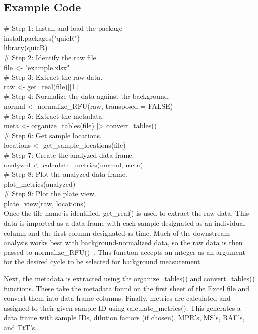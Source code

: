\documentclass[preprint,12pt,a4paper]{elsarticle}
\begin{document}
        \subsection{Example Code}
            \# Step 1: Install and load the package\\
            install.packages("quicR")\\
            library(quicR)\\
            \# Step 2: Identify the raw file.\\
            file <- "example.xlsx"\\
            \# Step 3: Extract the raw data.\\
            raw <- get\_real(file)[[1]]\\
            \# Step 4: Normalize the data against the background.\\
            normal <- normalize\_RFU(raw, transposed = FALSE)\\
            \# Step 5: Extract the metadata.\\
            meta <- organize\_tables(file) |> convert\_tables()\\
            \# Step 6: Get sample locations.\\
            locations <- get\_sample\_locations(file)\\
            \# Step 7: Create the analyzed data frame.\\
            analyzed <- calculate\_metrics(normal, meta)\\
            \# Step 8: Plot the analyzed data frame.\\
            plot\_metrics(analyzed)\\
            \# Step 9: Plot the plate view.\\
            plate\_view(raw, locations)\\

            Once the file name is identified, get\_real() is used to extract the raw data. This data is imported as a data frame with each sample designated as an individual column and the first column designated as time. Much of the downstream analysis works best with background-normalized data, so the raw data is then passed to normalize\_RFU()~\cite{Rowden2023}. This function accepts an integer as an argument for the desired cycle to be selected for background measurement. 
            
            Next, the metadata is extracted using the organize\_tables() and convert\_tables() functions. These take the metadata found on the first sheet of the Excel file and convert them into data frame columns. Finally, metrics are calculated and assigned to their given sample ID using calculate\_metrics(). This generates a data frame with sample IDs, dilution factors (if chosen), MPR's, MS's, RAF's, and TtT's.
\end{document}
